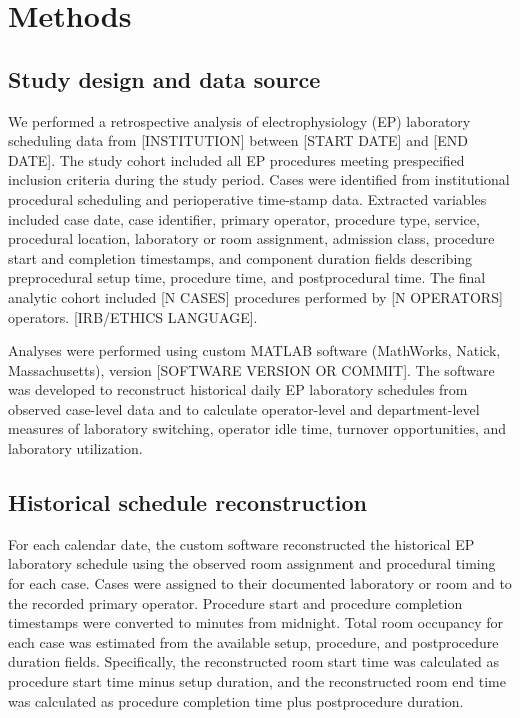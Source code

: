 \documentclass[12pt]{article}
\begin{document}
\section{Methods}

\subsection{Study design and data source}

We performed a retrospective analysis of electrophysiology (EP) laboratory scheduling data from [INSTITUTION] between [START DATE] and [END DATE]. The study cohort included all EP procedures meeting prespecified inclusion criteria during the study period. Cases were identified from institutional procedural scheduling and perioperative time-stamp data. Extracted variables included case date, case identifier, primary operator, procedure type, service, procedural location, laboratory or room assignment, admission class, procedure start and completion timestamps, and component duration fields describing preprocedural setup time, procedure time, and postprocedural time. The final analytic cohort included [N CASES] procedures performed by [N OPERATORS] operators. [IRB/ETHICS LANGUAGE].

Analyses were performed using custom MATLAB software (MathWorks, Natick, Massachusetts), version [SOFTWARE VERSION OR COMMIT]. The software was developed to reconstruct historical daily EP laboratory schedules from observed case-level data and to calculate operator-level and department-level measures of laboratory switching, operator idle time, turnover opportunities, and laboratory utilization.

\subsection{Historical schedule reconstruction}

For each calendar date, the custom software reconstructed the historical EP laboratory schedule using the observed room assignment and procedural timing for each case. Cases were assigned to their documented laboratory or room and to the recorded primary operator. Procedure start and procedure completion timestamps were converted to minutes from midnight. Total room occupancy for each case was estimated from the available setup, procedure, and postprocedure duration fields. Specifically, the reconstructed room start time was calculated as procedure start time minus setup duration, and the reconstructed room end time was calculated as procedure completion time plus postprocedure duration.
\end{document}

